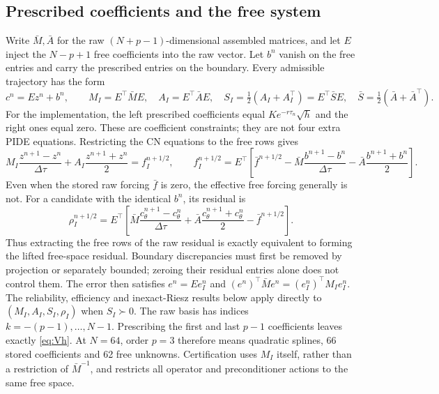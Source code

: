\documentclass[11pt]{amsart}
\theoremstyle{remark}
\begin{document}
\subsection{Prescribed coefficients and the free system}
\label{ssec:constrained-system}
Write $\bar M,\bar A$ for the raw $(N+p-1)$-dimensional assembled matrices,
and let $E$ inject the $N-p+1$ free coefficients into the raw vector.
Let $b^n$ vanish on the free entries and carry the prescribed entries on the
boundary. Every admissible trajectory has the form
\[
 c^n=Ez^n+b^n,\qquad
 M_I=E^\top\bar M E,\quad A_I=E^\top\bar A E,\quad
 S_I=\tfrac12(A_I+A_I^\top)=E^\top\bar S E,
 \quad \bar S=\tfrac12(\bar A+\bar A^\top).
\]
For the implementation, the left prescribed coefficients equal
$K e^{-r\tau_n}\sqrt h$ and the right ones equal zero. These are
coefficient constraints; they are not four extra PIDE equations.
Restricting the CN equations to the free rows gives
\begin{equation}
 M_I\frac{z^{n+1}-z^n}{\Delta\tau}
 +A_I\frac{z^{n+1}+z^n}{2}=f_I^{n+1/2},\qquad
 f_I^{n+1/2}=E^\top\!\left[\bar f^{n+1/2}
 -\bar M\frac{b^{n+1}-b^n}{\Delta\tau}
 -\bar A\frac{b^{n+1}+b^n}{2}\right].
 \label{eq:constrained-cn}
\end{equation}
Even when the stored raw forcing $\bar f$ is zero, the effective free forcing
generally is not. For a candidate with the identical $b^n$, its residual is
\begin{equation}
 \rho_I^{n+1/2}=E^\top\!\left[\bar M\frac{c_\theta^{n+1}-c_\theta^n}{\Delta\tau}
 +\bar A\frac{c_\theta^{n+1}+c_\theta^n}{2}-\bar f^{n+1/2}\right].
 \label{eq:constrained-residual}
\end{equation}
Thus extracting the free rows of the raw residual is exactly equivalent to
forming the lifted free-space residual. Boundary discrepancies must first be
removed by projection or separately bounded; zeroing their residual entries
alone does not control them. The error then satisfies $e^n=Ee_I^n$ and
$(e^n)^\top\bar M e^n=(e_I^n)^\top M_I e_I^n$.
The reliability, efficiency and inexact-Riesz results below apply directly to
$(M_I,A_I,S_I,\rho_I)$ when $S_I\succ0$. 
The raw basis has indices $k=-(p-1),\ldots,N-1$. Prescribing the first and
last $p-1$ coefficients leaves exactly \eqref{eq:Vh}. At $N=64$, order
$p=3$ therefore means quadratic splines, 66 stored coefficients and 62 free
unknowns. Certification uses $M_I$ itself, rather than a restriction of
$\bar M^{-1}$, and restricts all operator and preconditioner actions to the
same free space.
\end{document}
